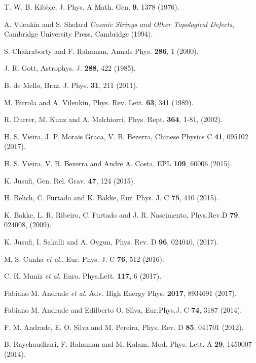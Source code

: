 \documentclass[preprint,superscriptaddress,amsfonts,amssymb,amsmath,showpacs]{revtex4}
\begin{document}
\begin{thebibliography}{99}

  T. W. B. Kibble,  J. Phys. A Math. Gen. \textbf{9}, 1378 (1976).

  A. Vilenkin and S. Shelard \textit{Cosmic Strings and Other Topological Defects}, Cambridge University Press, Cambridge (1994).

 S. Chakraborty and F. Rahaman, Annals Phys. \textbf{286}, 1 (2000). 

 J. R. Gott, Astrophys. J. \textbf{288}, 422 (1985).

 B. de Mello, Braz. J. Phys. \textbf{31}, 211 (2011).

  M. Birrola and A. Vilenkin, Phys. Rev. Lett. \textbf{63}, 341 (1989).

 R. Durrer, M. Kunz and A. Melchiorri, Phys. Rept. \textbf{364}, 1-81, (2002). 

 H. S. Vieira, J. P. Morais Graca, V. B. Bezerra, Chinese Physics C \textbf{41}, 095102 (2017). 

 H. S. Vieira, V. B. Bezerra and Andre A. Costa, EPL \textbf{109}, 60006 (2015).

 K. Jusufi, Gen. Rel. Grav. \textbf{47}, 124 (2015). 


 H. Belich, C. Furtado and K. Bakke, Eur. Phys. J. C \textbf{75}, 410 (2015).

 K. Bakke, L. R. Ribeiro, C. Furtado and J. R. Nascimento, Phys.Rev.D \textbf{79}, 024008, (2009).

 K. Jusufi, I. Sakalli and A. Ovgun, Phys. Rev. D \textbf{96}, 024040, (2017). 

 M. S. Cunha \textit{et al.},  Eur. Phys. J. C \textbf{76}, 512 (2016).
 
 C. R. Muniz \textit{et al.} Euro. Phys.Lett. \textbf{117}, 6 (2017).
 
 Fabiano M. Andrade \textit{et al.} Adv. High Energy Phys. \textbf{2017}, 8934691 (2017).

 Fabiano M. Andrade and Edilberto O. Silva, Eur.Phys.J. C \textbf{74}, 3187 (2014).

  F. M. Andrade, E. O. Silva and M. Pereira, Phys. Rev. D \textbf{85}, 041701 (2012).  

  B. Raychaudhuri, F. Rahaman and M. Kalam, Mod. Phys. Lett. A \textbf{29}, 1450007 (2014).


\end{thebibliography}
\end{document}

